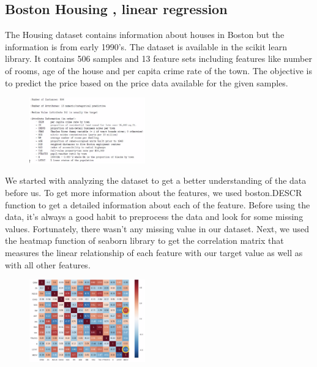 \documentclass[conference]{IEEEtran}
\begin{document}
\subsection{Boston Housing , linear regression}
The Housing dataset contains information about houses in Boston but the information is from early 1990’s. The dataset is available in the scikit learn library. It contains 506 samples and 13 feature sets including features like number of rooms, age of the house and per capita crime rate of the town. The objective is to predict the price based on the price data available for the given samples.

\begin{figure}[htbp]
\centerline{\includegraphics[width=50mm,scale=0.5]{imgs/analysis1}}
\label{fig}
\end{figure}

 We started with analyzing the dataset to get a better understanding of the data before us. To get more information about the features, we used boston.DESCR function to get a detailed information about each of the feature. Before using the data, it’s always a good habit to preprocess the data and look for some missing values. Fortunately, there wasn’t any missing value in our dataset. Next, we used the heatmap function of seaborn library to get the correlation matrix that measures the linear relationship of each feature with our target value as well as with all other features. 
 
\begin{figure}[htbp]
\centerline{\includegraphics[width=50mm,scale=0.5]{imgs/heatmap}}
\label{fig}
\end{figure}
\end{document}

